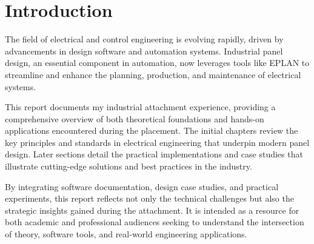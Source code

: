 \chapter{Introduction}
The field of electrical and control engineering is evolving rapidly, driven by advancements in design software and automation systems. Industrial panel design, an essential component in automation, now leverages tools like EPLAN to streamline and enhance the planning, production, and maintenance of electrical systems.

This report documents my industrial attachment experience, providing a comprehensive overview of both theoretical foundations and hands-on applications encountered during the placement. The initial chapters review the key principles and standards in electrical engineering that underpin modern panel design. Later sections detail the practical implementations and case studies that illustrate cutting-edge solutions and best practices in the industry.

By integrating software documentation, design case studies, and practical experiments, this report reflects not only the technical challenges but also the strategic insights gained during the attachment. It is intended as a resource for both academic and professional audiences seeking to understand the intersection of theory, software tools, and real-world engineering applications.